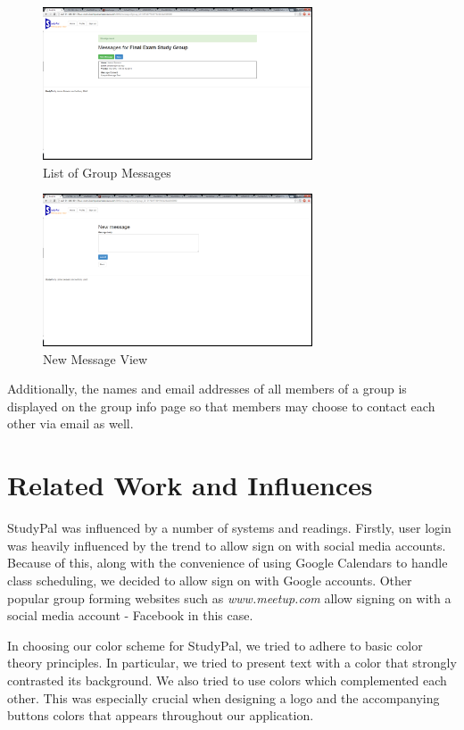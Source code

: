 \documentclass[conference]{IEEEtran}
\begin{document}
\begin{figure}[ht!]
\centering
\includegraphics[width=80mm]{figures/messageList}
\caption{List of Group Messages \label{fig:messageList}}
\end{figure}

\begin{figure}[ht!]
\centering
\includegraphics[width=80mm]{figures/newMessage}
\caption{New Message View \label{fig:newMessage}}
\end{figure}

Additionally, the names and email addresses of all members of a group is displayed on the group info page so that members may choose to contact each other via email as well.

\section{Related Work and Influences}

StudyPal was influenced by a number of systems and readings.  Firstly, user login was heavily influenced by the trend to allow sign on with social media accounts.  Because of this, along with the convenience of using Google Calendars to handle class scheduling, we decided to allow sign on with Google accounts.  Other popular group forming websites such as \emph{www.meetup.com} allow signing on with a social media account - Facebook in this case.

In choosing our color scheme for StudyPal, we tried to adhere to basic color theory principles\cite{thomas:color:online}.  In particular, we tried to present text with a color that strongly contrasted its background.  We also tried to use colors which complemented each other.  This was especially crucial when designing a logo and the accompanying buttons colors that appears throughout our application.
\end{document}
